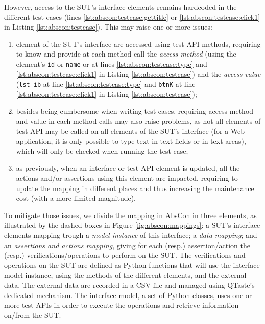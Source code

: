However, access to the SUT's interface elements remains hardcoded in the different test cases (\eg lines \ref{lst:abscon:testcase:gettitle} or \ref{lst:abscon:testcase:click1} in Listing \ref{lst:abscon:testcase}). This may raise one or more  issues:
\begin{enumerate}
	\item element of the SUT's interface are accessed using test API methods, requiring to know and provide at each method call the \emph{access method}  (\eg using the element's \texttt{id} or \texttt{name} or at lines \ref{lst:abscon:testcase:type} and \ref{lst:abscon:testcase:click1} in Listing \ref{lst:abscon:testcase}) and the \emph{access value} (\eg \texttt{lst-ib} at line \ref{lst:abscon:testcase:type} and \texttt{btnK} at line \ref{lst:abscon:testcase:click1} in Listing \ref{lst:abscon:testcase});
	\item besides being cumbersome when writing test cases, requiring access method and value in each method calls may also raise  problems, as not all elements of test API may be called on all elements of the SUT's interface (\eg for a Web-application, it is only possible to type text in text fields or in text areas), which will only be checked when running the test case;
	\item as previously, when an interface or test API element is updated, all the actions and/or assertions using this element are impacted, requiring to update the mapping in different places and thus increasing the maintenance cost (with a more limited magnitude).
\end{enumerate}

To mitigate those issues, we divide the mapping in AbsCon in three elements, as illustrated by the dashed boxes in Figure \ref{fig:abscon:mappings}: a SUT's interface elements mapping trough a \emph{model instance} of this interface; a \emph{data mapping}; and an \emph{assertions and actions mapping}, giving for each (resp.) assertion/action the (resp.) verifications/operations to perform on the SUT. The verifications and operations on the SUT are defined as Python functions that will use the interface model instance, using the methods of the different elements, and the external data. The external data are recorded in a CSV file and managed using QTaste's dedicated mechanism. The interface model, \ie a set of Python classes, uses one or more test APIs in order to execute the operations and retrieve information on/from the SUT. 

